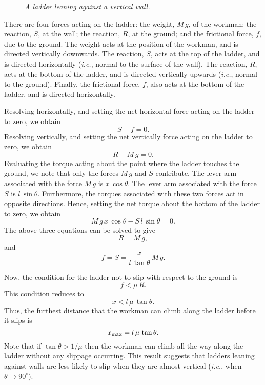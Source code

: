 \begin{figure}
\epsfysize=2in
\centerline{}
\caption{\em A ladder leaning against a vertical wall.}\label{f94}  
\end{figure}

There are four forces acting on the ladder: the weight, $M\,g$, of the workman; the
reaction, $S$, at the wall; the reaction, $R$, at the ground; and the frictional force,
$f$, due to the ground. The weight acts at the position of the workman, and is directed
vertically downwards. The reaction, $S$, acts at the top of the ladder, and is directed
horizontally ({\em i.e.}, normal to the surface of the wall). The reaction, $R$, acts at
the bottom of the ladder, and is directed vertically upwards  ({\em i.e.}, normal to the ground).
Finally, the frictional force, $f$, also acts at the bottom of the ladder, and is directed
horizontally.

Resolving horizontally, and setting the net horizontal force acting on the ladder to
zero, we obtain
\begin{equation}
S - f = 0.
\end{equation}
Resolving vertically, and setting the net vertically force acting on the ladder to
zero, we obtain
\begin{equation}
R - M\,g = 0.
\end{equation}
Evaluating the torque acting about the point where the ladder touches the ground, we
note that only the forces $M\,g$ and $S$ contribute. The lever arm associated with the
force $M\,g$ is $x\,\cos\theta$. The lever arm associated with the force $S$ is $l\,\sin\theta$.
Furthermore, the torques associated with these two forces act in opposite directions.
Hence, setting the net torque about the bottom of the ladder to zero, we obtain
\begin{equation}
M\,g\,x\,\cos\theta - S\,l\,\sin\theta = 0.
\end{equation}
The above three equations can be solved to give
\begin{equation}
R = M\,g,
\end{equation}
and 
\begin{equation}
f = S = \frac{x}{l\,\tan\theta} \,M\,g.
\end{equation}

Now, the condition for the ladder not to slip with respect to the ground is
\begin{equation}
f < \mu\,R.
\end{equation}
This condition reduces to
\begin{equation}
x<l\, \mu\,\tan\theta.
\end{equation}
Thus, the furthest distance that the workman can climb along the ladder before it
slips is
\begin{equation}
x_{\rm max} = l\,\mu\,\tan\theta.
\end{equation}
Note that if $\tan\theta > 1/\mu$ then the workman can climb all the way along the
ladder without any slippage occurring. This result suggests that ladders leaning against
walls are less likely to slip when they
are almost vertical ({\em i.e.}, when $\theta\rightarrow 90^\circ$).

